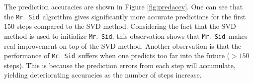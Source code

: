 \documentclass[times,twocolumn,final,authoryear]{elsarticle}
\newcommand{\mrsid}{{\sc \texttt{Mr}.~\texttt{Sid}}}
\let\oldref\ref
\renewcommand{\ref}[1]{(\oldref{#1})}
\begin{document}
The prediction accuracies are shown in Figure \oldref{fig:predaccy}. One can see that the \mrsid~algorithm gives significantly more accurate predictions for the first 150 steps compared to the SVD method. Considering the fact that the SVD method is used to initialize \mrsid, this observation shows that \mrsid~makes real improvement on top of the SVD method. Another observation is that the performance of \mrsid~suffers when one predicts too far into the future ($>150$ steps). This is because the prediction errors from each step will accumulate, yielding deteriorating accuracies as the number of steps increase.
\end{document}
